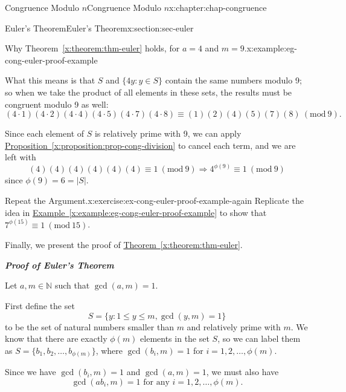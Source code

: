 \documentclass[oneside,10pt,]{book}
\newcommand{\xreffont}{\relax}
\newcommand{\alert}[1]{\textbf{\textit{#1}}}
\numberwithin{equation}{section}
\newcommand{\Mod}[1]{\ \left(\mathrm{mod}\ #1\right)}
\begin{document}
\begin{chapterptx}{Congruence Modulo \(n\)}{}{Congruence Modulo \(n\)}{}{}{x:chapter:chap-congruence}
\begin{sectionptx}{Euler's Theorem}{}{Euler's Theorem}{}{}{x:section:sec-euler}
\begin{example}{Why Theorem~{\xreffont\ref*{x:theorem:thm-euler}} holds, for \(a = 4\) and \(m = 9\).}{x:example:eg-cong-euler-proof-example}
\begin{sidebyside}{1}{0.125}{0.125}{0}
\begin{sbspanel}{0.75}
{{}%
\par}
\end{sbspanel}%
\end{sidebyside}%
\par
What this means is that \(S\) and \(\{4y : y \in S\}\) contain the same numbers modulo 9; so when we take the product of all elements in these sets, the results must be congruent modulo 9 as well:%
\begin{equation*}
(4\cdot 1)(4\cdot 2)(4\cdot 4)(4 \cdot 5)(4\cdot 7)(4\cdot 8) \equiv (1)(2)(4)(5)(7)(8)\Mod{9}\text{.}
\end{equation*}
%
\par
Since each element of \(S\) is relatively prime with 9, we can apply \hyperref[x:proposition:prop-cong-division]{Proposition~{\xreffont\ref{x:proposition:prop-cong-division}}} to cancel each term, and we are left with%
\begin{equation*}
(4)(4)(4)(4)(4)(4) \equiv 1 \Mod{9} \Rightarrow 4^{\phi(9)} \equiv 1 \Mod{9}
\end{equation*}
since \(\phi(9) = 6 = |S|\).%
\end{example}
\begin{inlineexercise}{Repeat the Argument.}{x:exercise:ex-cong-euler-proof-example-again}%
Replicate the idea in \hyperref[x:example:eg-cong-euler-proof-example]{Example~{\xreffont\ref{x:example:eg-cong-euler-proof-example}}} to show that \(7^{\phi(15)} \equiv 1 \Mod{15}\).%
\end{inlineexercise}
Finally, we present the proof of \hyperref[x:theorem:thm-euler]{Theorem~{\xreffont\ref{x:theorem:thm-euler}}}.%
\par
\alert{Proof of Euler's Theorem}%
\par
Let \(a,m \in \mathbb{N}\) such that \(\gcd(a,m) = 1\).%
\par
First define the set%
\begin{equation*}
S = \{y : 1 \leq y \leq m, \gcd(y,m) = 1\}
\end{equation*}
to be the set of natural numbers smaller than \(m\) and relatively prime with \(m\). We know that there are exactly \(\phi(m)\) elements in the set \(S\), so we can label them as \(S = \{b_1,b_2,\ldots,b_{\phi(m)}\}\), where \(\gcd(b_i,m) = 1\) for \(i = 1,2,\ldots,\phi(m)\).%
\par
Since we have \(\gcd(b_i,m) = 1\) and \(\gcd(a,m) = 1\), we must also have%
\begin{equation*}
\gcd(ab_i, m) = 1 \text{ for any } i = 1,2,\ldots,\phi(m)\text{.}
\end{equation*}

\end{sectionptx}
\end{chapterptx}
\end{document}

